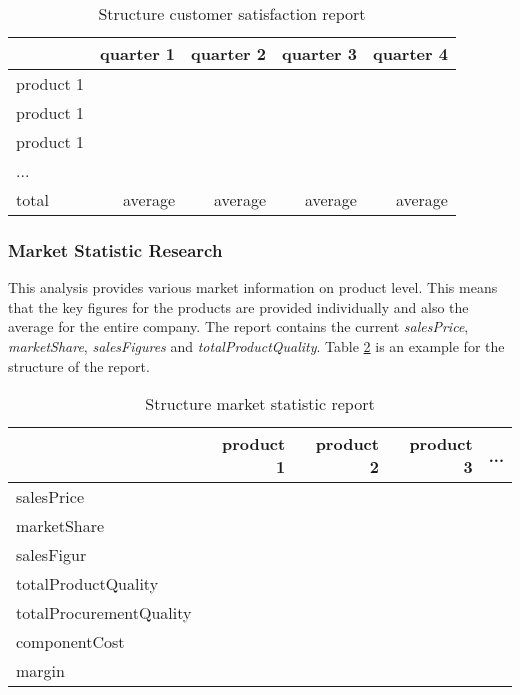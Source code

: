 \begin{table}[ht]
\centering
\begin{tabular}{|l|r|r|r|r|}
\hline
& \textbf{quarter 1}   & \textbf{quarter 2}  & \textbf{quarter 3} & \textbf{quarter 4} \\ \hline
product 1   &             &            &           &           \\
product 1   &             &            &           &           \\
product 1   &             &            &           &           \\
...         &             &            &           &           \\
total       & average     & average    & average   & average   \\
\hline
\end{tabular}
\caption{Structure customer satisfaction report}
\label{MR_customer_satisfaction}
\end{table}

\subsubsection{Market Statistic Research}
This analysis provides various market information on product level. This means that the key figures for the products are provided individually and also the average for the entire company. The report contains the current \textit{salesPrice}, \textit{marketShare}, \textit{salesFigures} and \textit{totalProductQuality}. Table \ref{MR_market_statistic} is an example for the structure of the report. \\

\begin{table}[ht]
\centering
\begin{tabular}{|l|r|r|r|r|}
\hline
 & \textbf{product 1}   & \textbf{product 2}  & \textbf{product 3} & \textbf{...}  \\ \hline
salesPrice          &             &            &           &           \\
marketShare         &             &            &           &           \\
salesFigur          &             &            &           &           \\
totalProductQuality &             &            &           &           \\
totalProcurementQuality  &        &            &           &           \\
componentCost       &             &            &           &           \\
margin              &             &            &           &           \\
\hline
\end{tabular}
\caption{Structure market statistic report}
\label{MR_market_statistic}
\end{table}